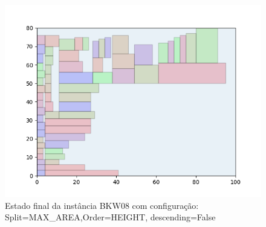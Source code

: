 \begin{figure}[H]
    \centering
    \caption[]{Estado final da instância BKW08 com configuração: Split=MAX_AREA,Order=HEIGHT, descending=False}
    \label{fig:bkw08-max_area-height-false}
    \includegraphics[scale=0.5]{output/figures/bkw/bkw08/max_area/height/false/00}
\end{figure}
